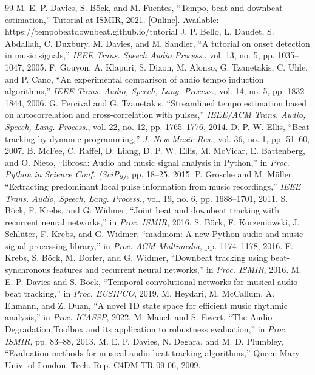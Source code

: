 \begin{thebibliography}{99}\small\setlength{\itemsep}{0pt}
 M. E. P. Davies, S. B\"ock, and M. Fuentes, ``Tempo, beat and downbeat estimation,'' Tutorial at ISMIR, 2021. [Online]. Available: https://tempobeatdownbeat.github.io/tutorial
 J. P. Bello, L. Daudet, S. Abdallah, C. Duxbury, M. Davies, and M. Sandler, ``A tutorial on onset detection in music signals,'' \emph{IEEE Trans. Speech Audio Process.}, vol. 13, no. 5, pp. 1035--1047, 2005.
 F. Gouyon, A. Klapuri, S. Dixon, M. Alonso, G. Tzanetakis, C. Uhle, and P. Cano, ``An experimental comparison of audio tempo induction algorithms,'' \emph{IEEE Trans. Audio, Speech, Lang. Process.}, vol. 14, no. 5, pp. 1832--1844, 2006.
 G. Percival and G. Tzanetakis, ``Streamlined tempo estimation based on autocorrelation and cross-correlation with pulses,'' \emph{IEEE/ACM Trans. Audio, Speech, Lang. Process.}, vol. 22, no. 12, pp. 1765--1776, 2014.
 D. P. W. Ellis, ``Beat tracking by dynamic programming,'' \emph{J. New Music Res.}, vol. 36, no. 1, pp. 51--60, 2007.
 B. McFee, C. Raffel, D. Liang, D. P. W. Ellis, M. McVicar, E. Battenberg, and O. Nieto, ``librosa: Audio and music signal analysis in Python,'' in \emph{Proc. Python in Science Conf. (SciPy)}, pp. 18--25, 2015.
 P. Grosche and M. M\"uller, ``Extracting predominant local pulse information from music recordings,'' \emph{IEEE Trans. Audio, Speech, Lang. Process.}, vol. 19, no. 6, pp. 1688--1701, 2011.
 S. B\"ock, F. Krebs, and G. Widmer, ``Joint beat and downbeat tracking with recurrent neural networks,'' in \emph{Proc. ISMIR}, 2016.
 S. B\"ock, F. Korzeniowski, J. Schl\"uter, F. Krebs, and G. Widmer, ``madmom: A new Python audio and music signal processing library,'' in \emph{Proc. ACM Multimedia}, pp. 1174--1178, 2016.
 F. Krebs, S. B\"ock, M. Dorfer, and G. Widmer, ``Downbeat tracking using beat-synchronous features and recurrent neural networks,'' in \emph{Proc. ISMIR}, 2016.
 M. E. P. Davies and S. B\"ock, ``Temporal convolutional networks for musical audio beat tracking,'' in \emph{Proc. EUSIPCO}, 2019.
 M. Heydari, M. McCallum, A. Ehmann, and Z. Duan, ``A novel 1D state space for efficient music rhythmic analysis,'' in \emph{Proc. ICASSP}, 2022.
 M. Mauch and S. Ewert, ``The Audio Degradation Toolbox and its application to robustness evaluation,'' in \emph{Proc. ISMIR}, pp. 83--88, 2013.
 M. E. P. Davies, N. Degara, and M. D. Plumbley, ``Evaluation methods for musical audio beat tracking algorithms,'' Queen Mary Univ. of London, Tech. Rep. C4DM-TR-09-06, 2009.

\end{thebibliography}
